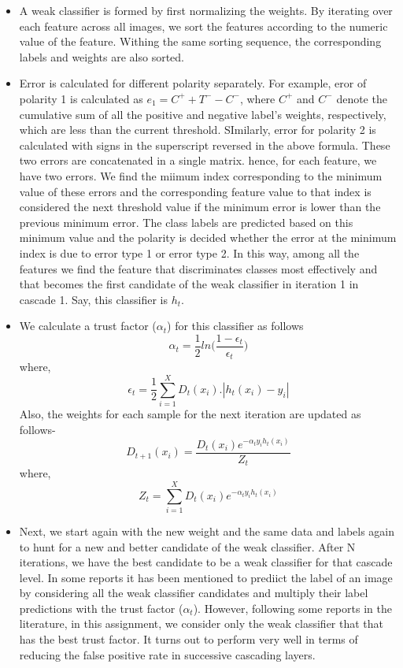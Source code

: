 \documentclass{article}
\begin{document}
\begin{itemize}
\item A weak classifier is formed by first normalizing the weights. By iterating over each feature across all images, we sort the features according to the numeric value of the feature. Withing the same sorting sequence, the corresponding labels and weights are also sorted.
\item Error is calculated for different polarity separately. For example, eror of polarity 1 is calculated as $e_1 = C^+ + T^- -C^-$, where $C^+$ and $C^-$ denote the cumulative sum of all the positive and negative label's weights, respectively, which are less than the current threshold. SImilarly, error for polarity 2 is calculated  with signs in the superscript reversed in the above formula. These two errors are concatenated in a single matrix. hence, for each feature, we have two errors. We find the miimum index corresponding to the minimum value of these errors and the corresponding feature value to that index is considered the next threshold value if the minimum error is lower than the previous minimum error. The class labels are predicted based on this minimum value and the polarity is decided whether the error at the minimum index is due to error type 1 or error type 2. In this way, among all the features we find the feature that discriminates classes most effectively and that becomes the first candidate of the weak classifier in iteration 1 in cascade 1. Say, this classifier is $h_t$.
\item We calculate a trust factor ($\alpha_t$) for this classifier as follows
\begin{equation}
	\alpha_t = \frac{1}{2}ln\bigg(\frac{1-\epsilon_t}{\epsilon_t}\bigg)
\end{equation}
where,
\begin{equation}
	\epsilon_t = \frac{1}{2}\sum_{i=1}^{X}D_t(x_i).|h_t(x_i) - y_i|
\end{equation}
Also, the weights for each sample for the next iteration are updated as follows-
\begin{equation}
	D_{t+1}(x_i) = \frac{D_t(x_i)e^{-\alpha_ty_ih_t(x_i)}}{Z_t}
\end{equation}
where,
\begin{equation}
	Z_t = \sum_{i=1}^{X}D_t(x_i)e^{-\alpha_ty_ih_t(x_i)}
\end{equation}
\item Next, we start again with the new weight and the same data and labels again to hunt for a new and better candidate of the weak classifier. After N iterations, we have the best candidate to be a weak classifier for that cascade level. In some reports it has been mentioned to prediict the label of an image by considering all the weak classifier candidates and multiply their label predictions with the trust factor ($\alpha_t$). However, following some reports in the literature, in this assignment, we consider only the weak classifier that that has the best trust factor. It turns out to perform very well in terms of reducing the false positive rate in successive cascading layers.

\end{itemize}
\end{document}
